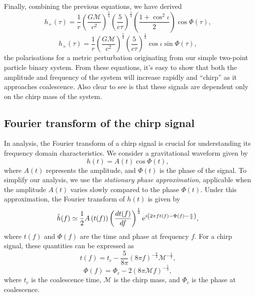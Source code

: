 Finally, combining the previous equations, we have derived
%
\begin{equation}
    h_{+}(\tau) = \frac{1}{r}\left(\frac{G\mathcal{M}}{c^{2}}\right)^{\frac{5}{4}}\left(\frac{5}{c\tau}\right)^{\frac{1}{4}}\left(\frac{1+\cos^{2}\iota}{2}\right)\cos\Phi(\tau),
\end{equation}
%
\begin{equation}
    h_{\times}(\tau) = \frac{1}{r}\left(\frac{G\mathcal{M}}{c^{2}}\right)^{\frac{5}{4}}\left(\frac{5}{c\tau}\right)^{\frac{1}{4}}\cos\iota\sin\Phi(\tau),
\end{equation}
%
the \gwadj polarisations for a metric perturbation originating from our simple two-point particle binary system. From these equations, it's easy to show that both the amplitude and frequency of the system will increase rapidly and ``chirp'' as it approaches coalescence. Also clear to see is that these \gwadj signals are dependent only on the chirp mass of the system.

\subsection{\label{1:sec:fourier_transform_chirp}Fourier transform of the chirp signal}

In \gwadj analysis, the Fourier transform of a chirp signal is crucial for understanding its frequency domain characteristics. We consider a gravitational waveform given by
%
\begin{equation}
    h(t) = A(t) \cos \Phi(t),
\end{equation}
%
where \( A(t) \) represents the amplitude, and \( \Phi(t) \) is the phase of the signal. To simplify our analysis, we use the \textit{stationary phase approximation}, applicable when the amplitude \( A(t) \) varies slowly compared to the phase \( \Phi(t) \). Under this approximation, the Fourier transform of \( h(t) \) is given by
%
\begin{equation}
    \Tilde{h}(f) \simeq \frac{1}{2} A\left(t(f)\right) \left(\frac{dt(f)}{df}\right)^{\frac{1}{2}} {\rm e}^{i \left(2\pi f t(f) - \Phi(f) - \frac{\pi}{4}\right)},
\end{equation}
%
where \( t(f) \) and \( \Phi(f) \) are the time and phase at frequency \( f \). For a chirp signal, these quantities can be expressed as
%
\begin{equation}
    t(f) = t_c - \frac{5}{8\pi}\left(8\pi f\right)^{-\frac{8}{3}} \mathcal{M}^{-\frac{5}{3}},
\end{equation}
%
\begin{equation}
    \Phi(f) = \Phi_c - 2\left(8\pi \mathcal{M} f\right)^{-\frac{5}{3}},
\end{equation}
%
where \( t_c \) is the coalescence time, \( \mathcal{M} \) is the chirp mass, and \( \Phi_c \) is the phase at coalescence.


